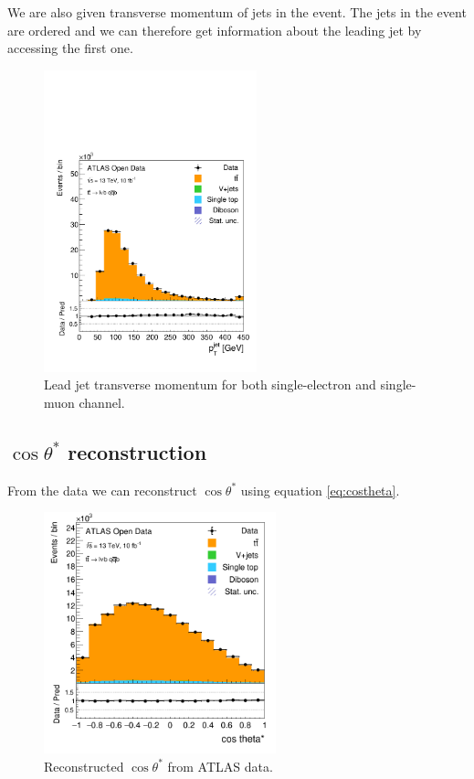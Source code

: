 \documentclass[12pt,a4paper]{article}
\begin{document}
We are also given transverse momentum of jets in the event. %
The jets in the event are ordered and we can therefore get information about the
leading jet by accessing the first one. %
\begin{figure}[H]
  \centering
  \includegraphics[width=0.55\textwidth]{figures/hist_leadjet_pt}
  \caption{\label{fig:jetpt}Lead jet transverse momentum for both single-electron and single-muon channel.}
\end{figure}



\subsection{$\cos \theta^{*}$ reconstruction}
From the data we can reconstruct $\cos \theta^{*}$ using equation \eqref{eq:costheta}.
\begin{figure}[H]
  \centering
  \includegraphics[width=0.6\textwidth]{figures/hist_costheta}
  \caption{\label{fig:costhetaatlas}Reconstructed $\cos \theta^{*}$ from ATLAS data.}
\end{figure}
\end{document}
